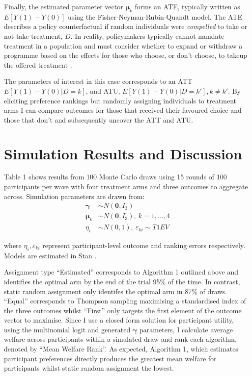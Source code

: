 \documentclass[twoside,11pt]{article}
\begin{document}
Finally, the estimated parameter vector $\bm{\mu}_k$ forms an ATE, typically 
written as $E[Y(1) - Y(0)]$ using the Fisher-Neyman-Rubin-Quandt model. The 
ATE describes a policy counterfactual if random individuals were \textit{compelled}
to take or not take treatment, $D$. In reality, policymakers typically cannot 
mandate treatment in a population and must consider whether to expand or 
withdraw a programme based on the effects for those who choose, or don't choose, 
to takeup the offered treatment \citep{heckman-1,heckman-2}.

The parameters of interest in this case corresponds to an ATT $E[Y(1) - Y(0) | D = k]$, 
and ATU, $E[Y(1) - Y(0) | D = k'], k \neq k'$. By eliciting preference rankings 
but randomly assigning individuals to treatment arms I can compare outcomes 
for those that received their favoured choice and those that don't and subsequently 
uncover the ATT and ATU.



 
\section*{Simulation Results and Discussion}


Table 1 shows results from 100 Monte Carlo draws using 15 rounds of 100 
participants per wave with four treatment arms and three outcomes to 
aggregate across. Simulation parameters are drawn from:
\begin{align*}
  \bm{\gamma} &\sim N(\bm{0}, I_3) \\
  \bm{\mu}_k &\sim N(\bm{0}, I_3), \ k = 1, ..., 4 \\
  \eta_i &\sim N(0, 1),\ \varepsilon_{ki} \sim T1EV
\end{align*}

where $\eta_i, \varepsilon_{ki}$ represent participant-level outcome and 
ranking errors respectively. Models are estimated in Stan \citep{carpenter2017a}.

Assignment type ``Estimated'' corresponds to Algorithm 1 outlined above and 
identifies the optimal arm by the end of the trial 95\% of the time. In contrast, 
static random assignment only identifes the optimal arm in 87\% of draws. ``Equal''
corresponds to Thompson sampling maximising a standardised index of the three 
outcomes whilst ``First'' only targets the first element of the outcome vector to 
maximise. Since I use a closed form solution for participant utility, using the 
multinomial logit and generated $\bm{\gamma}$ parameters, I calculate average 
welfare across participants within a simulated draw and rank each algorithm, 
denoted by ``Mean Welfare Rank''. As expected, Algorithm 1, which estimates 
participant preferences directly produces the greatest mean welfare for participants 
whilst static random assignment the lowest.
\end{document}
